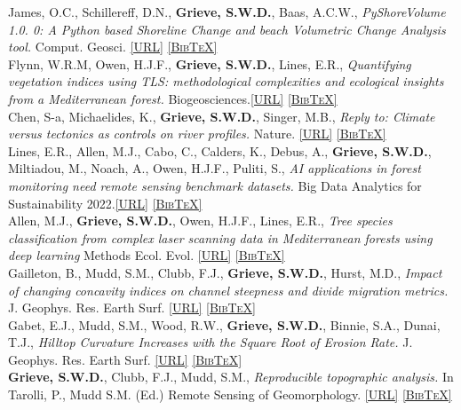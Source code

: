 \documentclass[10pt, a4paper]{article}
\newcommand{\doi}[1]{\href{https://dx.doi.org/#1}{\scriptsize\textsc{[URL]}}}
\newcommand{\bib}[1]{\href{https://www.doi2bib.org/bib/#1}{\scriptsize\textsc{[BibTeX]}}}
\newcommand{\paperlinks}[1]{\doi{#1} \bib{#1}}
\newcommand{\student}{\textbf{\textsuperscript{\textdagger}}}
\newcommand{\years}[1]{\marginnote{\scriptsize #1}}
\begin{document}
\years{2024}James, O.C.\student, Schillereff, D.N., \textbf{Grieve, S.W.D.}, Baas, A.C.W., \textit{PyShoreVolume 1.0. 0: A Python based Shoreline Change and beach Volumetric Change Analysis tool.} Comput. Geosci. \paperlinks{10.1016/j.cageo.2024.105591} \\[0.05cm]

\years{2023}Flynn, W.R.M\student, Owen, H.J.F., \textbf{Grieve, S.W.D.}, Lines, E.R., \textit{Quantifying vegetation indices using TLS: methodological complexities and ecological insights from a Mediterranean forest.} Biogeosciences.\paperlinks{10.5194/bg-20-2769-2023} \\[0.05cm]

\years{2022}Chen, S-a, Michaelides, K., \textbf{Grieve, S.W.D.}, Singer, M.B., \textit{Reply to: Climate versus tectonics as controls on river profiles.} Nature. \paperlinks{10.1038/s41586-022-05419-0}\\[0.05cm]

\years{2022}Lines, E.R., Allen, M.J.\student, Cabo, C., Calders, K., Debus, A., \textbf{Grieve, S.W.D.}, Miltiadou, M., Noach, A., Owen, H.J.F., Puliti, S., \textit{AI applications in forest monitoring need remote sensing benchmark datasets.} Big Data Analytics for Sustainability 2022.\paperlinks{10.48550/arXiv.2212.09937}\\[0.05cm]

\years{2022}Allen, M.J.\student, \textbf{Grieve, S.W.D.}, Owen, H.J.F., Lines, E.R., \textit{Tree species classification from complex laser scanning data in Mediterranean forests using deep learning} Methods Ecol. Evol. \paperlinks{10.1111/2041-210X.13981}\\[0.05cm]

\years{2021}Gailleton, B., Mudd, S.M., Clubb, F.J., \textbf{Grieve, S.W.D.}, Hurst, M.D., \textit{Impact of changing concavity indices on channel steepness and divide migration metrics.} J. Geophys. Res. Earth Surf. \paperlinks{10.1029/2020JF006060}\\[0.05cm]

\years{2021}Gabet, E.J., Mudd, S.M., Wood, R.W., \textbf{Grieve, S.W.D.}, Binnie, S.A., Dunai, T.J., \textit{Hilltop Curvature Increases with the Square Root of Erosion Rate.} J. Geophys. Res. Earth Surf. \paperlinks{10.1029/2020JF005858}\\[0.05cm]

\years{2020} \textbf{Grieve, S.W.D.}, Clubb, F.J., Mudd, S.M., \textit{Reproducible topographic analysis.} In Tarolli, P., Mudd S.M. (Ed.) Remote Sensing of Geomorphology. \paperlinks{10.1016/B978-0-444-64177-9.00012-6}\\[0.05cm]
\end{document}
